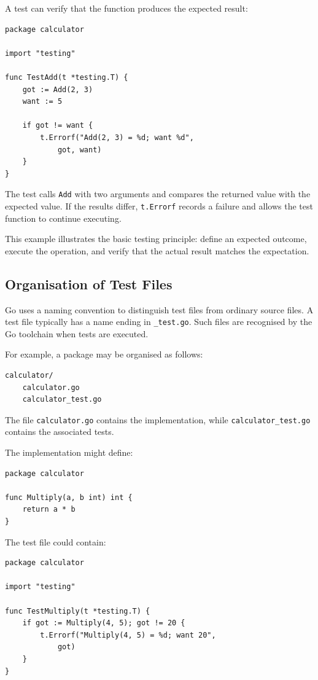 A test can verify that the function produces the expected result:

\begin{lstlisting}
package calculator

import "testing"

func TestAdd(t *testing.T) {
    got := Add(2, 3)
    want := 5

    if got != want {
        t.Errorf("Add(2, 3) = %d; want %d",
            got, want)
    }
}
\end{lstlisting}

The test calls \texttt{Add} with two arguments and compares the returned value with the expected value. If the results differ, \texttt{t.Errorf} records a failure and allows the test function to continue executing.

This example illustrates the basic testing principle: define an expected outcome, execute the operation, and verify that the actual result matches the expectation.

\subsection{Organisation of Test Files}

Go uses a naming convention to distinguish test files from ordinary source files. A test file typically has a name ending in \texttt{\_test.go}. Such files are recognised by the Go toolchain when tests are executed.

For example, a package may be organised as follows:

\begin{lstlisting}
calculator/
    calculator.go
    calculator_test.go
\end{lstlisting}

The file \texttt{calculator.go} contains the implementation, while \texttt{calculator_test.go} contains the associated tests.

The implementation might define:

\begin{lstlisting}
package calculator

func Multiply(a, b int) int {
    return a * b
}
\end{lstlisting}

The test file could contain:

\begin{lstlisting}
package calculator

import "testing"

func TestMultiply(t *testing.T) {
    if got := Multiply(4, 5); got != 20 {
        t.Errorf("Multiply(4, 5) = %d; want 20",
            got)
    }
}
\end{lstlisting}

